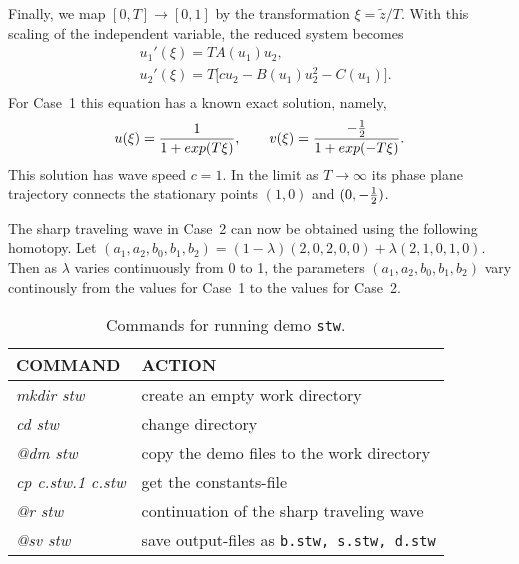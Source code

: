 \documentclass[12pt]{report}
\begin{document}
\newpage 
Finally, we  map $ [0,T] \rightarrow [0,1] $
by the transformation $\xi = \tilde z / T$.
With this scaling of the independent variable, the reduced system
becomes
\begin{equation} \begin{array}{cl}
  & u_1'(\xi) = T A(u_1) u_2,  \\
  & u_2'(\xi) = T \bigl[ c u_2 - B(u_1) u_2^{2} - C(u_1)\bigr]. \\
\end{array} \end{equation}
For Case~1 this equation has a known exact solution, namely,
$$ u(\xi) = { 1 \over 1 + exp(T\xi) }, \qquad
  v(\xi) = { -{1 \over 2}  \over 1 + exp(-T\xi) }. $$
This solution has wave speed $c=1$.
In the limit as $T \rightarrow \infty$ its phase plane trajectory
connects the stationary points $(1,0)$ and $(0,-{1 \over 2})$.
 
The sharp traveling wave in Case~2
can now be obtained using the following homotopy.
Let
$(a_1,a_2,b_0,b_1,b_2) =
  (1-\lambda) (2,0,2,0,0) + \lambda (2,1,0,1,0)$.
Then as $\lambda$ varies continuously from 0 to 1, the parameters
$(a_1,a_2,b_0,b_1,b_2)$
vary continously from the values for Case~1
  to the values for Case~2.


\begin{table}[htbp]
\begin{center}
\begin{tabular}{| l | l |}
\hline
  COMMAND  & ACTION \\
\hline
  {\it mkdir stw} & create an empty work directory \\ 
  {\it cd stw} & change directory \\
  {\it @dm stw} & copy the demo files to the work directory \\
\hline
  {\it cp c.stw.1 c.stw} & get the constants-file \\ 
  {\it @r stw} & continuation of the sharp traveling wave \\ 
  {\it @sv stw} & save output-files as {\tt b.stw, s.stw, d.stw} \\ 
\hline
\end{tabular}
\caption{Commands for running demo {\tt stw}.}
\label{tbl:demo_stw_2}
\end{center}
\end{table}
\end{document}
